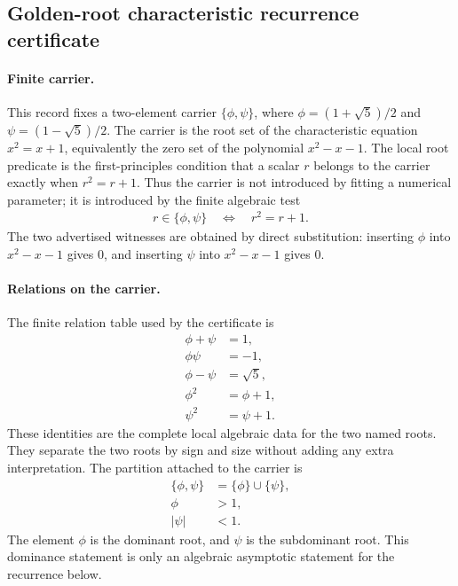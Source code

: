 
\subsection{Golden-root characteristic recurrence certificate}
\label{sec:binet-golden-ratio-characteristic-recurrence}

\paragraph{Finite carrier.}
This record fixes a two-element carrier
$\{\phi,\psi\}$, where
$\phi=(1+\sqrt{5})/2$ and $\psi=(1-\sqrt{5})/2$.
The carrier is the root set of the characteristic equation $x^2=x+1$, equivalently the zero set of the polynomial $x^2-x-1$.  The local root predicate is the first-principles condition that a scalar $r$ belongs to the carrier exactly when $r^2=r+1$.  Thus the carrier is not introduced by fitting a numerical parameter; it is introduced by the finite algebraic test
$$
\begin{aligned}
 r \in \{\phi,\psi\} \quad \Longleftrightarrow \quad r^2=r+1.
\end{aligned}
$$
The two advertised witnesses are obtained by direct substitution: inserting $\phi$ into $x^2-x-1$ gives $0$, and inserting $\psi$ into $x^2-x-1$ gives $0$.

\paragraph{Relations on the carrier.}
The finite relation table used by the certificate is
$$
\begin{aligned}
\phi+\psi &= 1,\\
\phi\psi &= -1,\\
\phi-\psi &= \sqrt{5},\\
\phi^2 &= \phi+1,\\
\psi^2 &= \psi+1.
\end{aligned}
$$
These identities are the complete local algebraic data for the two named roots.  They separate the two roots by sign and size without adding any extra interpretation.  The partition attached to the carrier is
$$
\begin{aligned}
\{\phi,\psi\} &= \{\phi\} \cup \{\psi\},\\
\phi &> 1,\\
|\psi| &< 1.
\end{aligned}
$$
The element $\phi$ is the dominant root, and $\psi$ is the subdominant root.  This dominance statement is only an algebraic asymptotic statement for the recurrence below.

